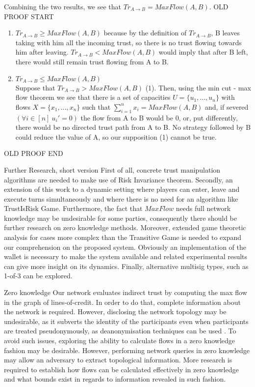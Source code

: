        Combining the two results, we see that $Tr_{A \rightarrow B} = MaxFlow(A, B)$.
        OLD PROOF START
        \begin{enumerate}
           \item $Tr_{A \rightarrow B} \geq MaxFlow(A, B)$ because by the definition of $Tr_{A \rightarrow B}$,
           B leaves taking with him all the incoming trust, so there is no trust flowing towards him after leaving.
           $Tr_{A \rightarrow B} < MaxFlow(A, B)$ would imply that after B left, there would still remain trust
           flowing from A to B.
           \item $Tr_{A \rightarrow B} \leq MaxFlow(A, B)$ \\
           Suppose that $Tr_{A \rightarrow B} > MaxFlow(A, B)$ (1). Then, using the min cut - max flow theorem we
           see that there is a set of capacities $U= \{u_1,\dots,u_n\}$ with flows $X = \{x_1,\dots,x_n\}$ such that
           $\sum\limits_{i=1}^{n}{x_i} = MaxFlow(A, B)$ and, if severed $(\forall i \in [n] \: u_i' = 0)$
           the flow from A to B would be $0$, or, put differently, there would be no directed trust path from A to B. No
           strategy followed by B could reduce the value of A, so our supposition (1) cannot be true.
        \end{enumerate}
        OLD PROOF END

     Further Research, short version
     First of all, concrete trust manipulation algorithms are needed to make use of Risk Invariance theorem. Secondly, an
     extension of this work to a dynamic setting where players can enter, leave and execute turns simultaneously and where
     there is no need for an algorithm like TrustIsRisk Game. Furthermore, the fact that $MaxFlow$ needs full network
     knowledge may be undesirable for some parties, consequently there should be further research on zero knowledge methods.
     Moreover, extended game theoretic analysis for cases more complex than the Transitive Game is needed to expand our
     comprehension on the proposed system. Obviously an implementation of the wallet is necessary to make the system
     available and related experimental results can give more insight on its dynamics. Finally, alternative multisig types,
     such as 1-of-3 can be explored.

Zero knowledge
     Our network evaluates indirect trust by computing the max flow in the graph of lines-of-credit. In order to do that,
     complete information about the network is required. However, disclosing the network topology may be undesirable, as it
     subverts the identity of the participants even when participants are treated pseudonymously, as deanonymisation
     techniques can be used \cite{deanonymisation}. To avoid such issues, exploring the ability to calculate flows in a zero
     knowledge fashion may be desirable. However, performing network queries in zero knowledge may allow an adversary to
     extract topological information. More research is required to establish how flows can be calculated effectively in zero
     knowledge and what bounds exist in regards to information revealed in such fashion.

